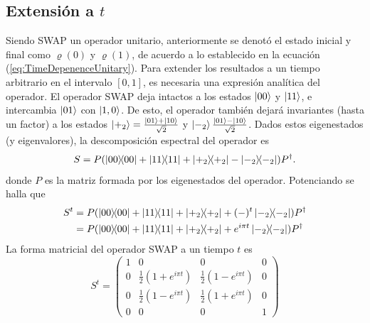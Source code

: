 \subsection{Extensión a $t$}
Siendo \textsc{SWAP} un operador unitario, anteriormente se denotó el estado inicial y final como $\varrho(0)$ y $\varrho(1)$, de acuerdo a lo establecido en la ecuación (\ref{eq:TimeDepenenceUnitary}). Para extender los resultados a un tiempo arbitrario en el intervalo $[0,1]$, es necesaria una expresión analítica del operador. El operador SWAP deja intactos a los estados $\ket{00}$ y $\ket{11}$, e intercambia $\ket{01}$ con $\ket{1,0}$. De esto, el operador también dejará invariantes (hasta un factor) a los estados $\ket{+_{2}}=\frac{\ket{01}+\ket{10}}{\sqrt{2}}$ y $\ket{-_{2}}\frac{\ket{01}-\ket{10}}{\sqrt{2}}$. Dados estos eigenestados (y eigenvalores), la descomposición espectral del operador es
\begin{equation}\label{eq:SWAPSpectral}
S=P(\dyad{00}+\dyad{11}+\dyad{+_{2}}-\dyad{-_{2}})P^{\dag}.
\end{equation}
donde $P$ es la matriz formada por los eigenestados del operador. Potenciando se halla que
\begin{align}\label{eq:SWAPPower}
S^{t}&=P(\dyad{00}+\dyad{11}+\dyad{+_{2}}+(-)^{t}\dyad{-_{2}})P^{\dag}\\
&=P(\dyad{00}+\dyad{11}+\dyad{+_{2}}+e^{i \pi t}\dyad{-_{2}})P^{\dag}
\end{align}
La forma matricial del operador \textsc{SWAP} a un tiempo $t$ es
\begin{equation}
S^{t}=\begin{pmatrix}
 1 & 0 & 0 & 0 \\
 0 & \frac{1}{2}(1+e^{i \pi t}) & \frac{1}{2} (1-e^{i \pi t}) & 0 \\
 0 & \frac{1}{2}(1-e^{i \pi t}) & \frac{1}{2}(1+e^{i \pi t}) & 0 \\
 0 & 0 & 0 & 1
\end{pmatrix}
\end{equation}
\newpage